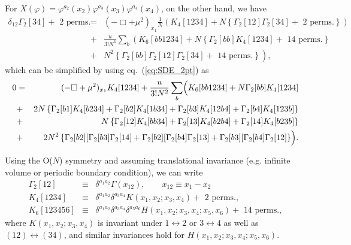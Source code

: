 \documentclass[preprint]{ptephy_v1}%
\begin{document}
For $X(\varphi) = \varphi^{a_2}(x_2) \varphi^{a_3}(x_3)\varphi^{a_4}(x_4)$, on the other hand, we have
\begin{eqnarray}
\delta_{12}\Gamma_2[34] +
\mbox{ 2 perms.}
 &=& (- \Box +\mu^2)_{x_1} \frac{1}{N}\left( K_4[1234]+ N\left\{\Gamma_2[12]\Gamma_2[34] + \mbox{ 2 perms.}\right\}\right) \nonumber \\
&+& 
\frac{u}{3! N^3}\sum_b \left(K_6[bb1234] + N\left\{\Gamma_2[bb]K_4[1234] + \mbox{ 14 perms.} \right\}\right.
\nonumber \\
&+&\left. N^2\left\{\Gamma_2[bb]\Gamma_2[12]\Gamma_2[34]+\mbox{ 14 perms.} \right\}\right),
\end{eqnarray}
which can be simplified by using eq.~(\ref{eq:SDE_2pt}) as
\begin{eqnarray}
0&=&  (- \Box +\mu^2)_{x_1}  K_4[1234] + \frac{u}{3! N^2}\sum_b \Bigl( K_6[bb1234]
+ N\Gamma_2[bb]K_4[1234] \nonumber \\
&+& 2N\left\{\Gamma_2[b1]K_4[b234] + \Gamma_2[b2]K_4[1b34]+\Gamma_2[b3]K_4[12b4]+\Gamma_2[b4]K_4[123b]
\right\}  \nonumber \\
&+&N\left\{ \Gamma_2[12]K_4[bb34] + \Gamma_2[13]K_4[b2b4]+\Gamma_2[14]K_4[b23b]
\right\} \nonumber \\  
&+& 2N^2\left\{\Gamma_2[b2][\Gamma_2[b3]\Gamma_2[14] + \Gamma_2[b2][\Gamma_2[b4]\Gamma_2[13]
+\Gamma_2[b3][\Gamma_2[b4]\Gamma_2[12]  
\right\}  \Bigr)  .
\label{eq:SDE_4pt}
\end{eqnarray}

Using the O($N$) symmetry and assuming translational invariance (e.g. infinite volume or periodic boundary condition), we can write
\begin{eqnarray}
\Gamma_2[12]&\equiv& \delta^{a_1a_2}\Gamma(x_{12}),\qquad x_{12}\equiv x_1-x_2 \\
K_4[1234]&\equiv& \delta^{a_1a_2} \delta^{a_3a_4} K(x_1,x_2;x_3,x_4) + \mbox{ 2 perms.} , \\
K_6[123456] &\equiv& \delta^{a_1a_2} \delta^{a_3a_4}  \delta^{a_5a_6} H(x_1,x_2;x_3,x_4;x_5,x_6) 
+  \mbox{ 14 perms.},
\end{eqnarray}
where $K(x_1,x_2;x_3,x_4)$ is invariant under $1\leftrightarrow 2$ or $3\leftrightarrow 4$ as well as
$(12)\leftrightarrow (34)$, and similar invariances hold for $H(x_1,x_2;x_3,x_4;x_5,x_6)$.
\end{document}
